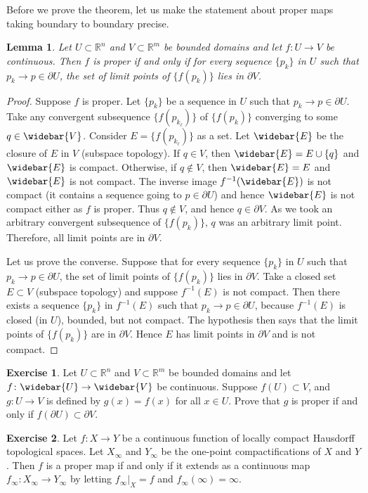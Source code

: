 \documentclass[12pt,openany]{book}
\newcommand{\R}{{\mathbb{R}}}
\theoremstyle{plain}
\newtheorem{lemma}[thm]{Lemma}
\theoremstyle{remark}
\theoremstyle{definition}
\newenvironment{exbox}{%
    \def\FrameCommand{\vrule width 1pt \relax\hspace{10pt}}%
    \MakeFramed{\advance\hsize-\width\FrameRestore}%
}{%
    \endMakeFramed
}
\theoremstyle{exercise}
\newtheorem{exercise}{Exercise}[section]
\theoremstyle{example}
\begin{document}
Before we prove the theorem, let us make the statement about
proper maps taking boundary to boundary precise.

\begin{lemma} \label{lemma:bndrytobndry}
Let $U \subset \R^n$ and $V \subset \R^m$ be bounded domains and
let $f \colon U \to V$ be continuous.
Then $f$ is proper if and only if
for every sequence $\{ p_k \}$ in $U$ such that $p_k \to p \in \partial U$,
the set of limit points of $\bigl\{ f(p_k) \bigr\}$ lies in $\partial V$.
\end{lemma}

\begin{proof}
Suppose $f$ is proper.  Let
$\{ p_k \}$ be a sequence in $U$ such that $p_k \to p \in \partial U$.
Take any convergent subsequence $\bigl\{ f(p_{k_\ell}) \bigr\}$ of
$\bigl\{ f(p_k) \bigr\}$
converging to some $q \in \widebar{V}$.  Consider
$E = \bigl\{ f(p_{k_\ell}) \bigr\}$ as a set.  Let $\widebar{E}$ be the closure of $E$
in $V$ (subspace topology).  If $q \in V$, then $\widebar{E} = E \cup \{ q
\}$ and $\widebar{E}$ is compact.
Otherwise, if $q \notin V$, then
$\widebar{E} = E$ and $\widebar{E}$ is not compact.
The inverse image $f^{-1}(\widebar{E})$
is not compact (it contains a sequence going to $p \in \partial U$)
and hence $\widebar{E}$ is not
compact either as $f$ is proper.  Thus $q \notin V$, and hence $q \in
\partial V$.
As we took an arbitrary convergent subsequence of $\bigl\{ f(p_k) \bigr\}$,
$q$ was an arbitrary limit point.
Therefore, all limit points are in $\partial V$.

Let us prove the converse.
Suppose that for every sequence
$\{ p_k \}$ in $U$ such that $p_k \to p \in \partial U$,
the set of limit points of $\bigl\{ f(p_k) \bigr\}$ lies in $\partial V$.
Take a closed set $E \subset V$ (subspace topology) and suppose $f^{-1}(E)$
is not compact.  Then there exists a sequence $\{ p_k \}$ in $f^{-1}(E)$
such that $p_k \to p \in \partial U$, because $f^{-1}(E)$ is closed
(in $U$), bounded, but not compact.
The hypothesis then says that the limit points of
$\bigl\{ f(p_k) \bigr\}$ are in $\partial V$.  Hence $E$ has limit points in
$\partial V$ and is not compact.
\end{proof}

\begin{exbox}
\begin{exercise}
Let $U \subset \R^n$ and $V \subset \R^m$ be bounded domains and
let $f \colon \widebar{U} \to \widebar{V}$ be continuous.
Suppose $f(U) \subset V$, and $g \colon U \to V$ is defined by
$g(x) = f(x)$ for all $x \in U$.
Prove that $g$ is proper if and only if $f(\partial U) \subset \partial V$.
\end{exercise}

\begin{exercise}
Let $f \colon X \to Y$ be a continuous function of locally compact Hausdorff topological spaces.
Let $X_\infty$ and $Y_\infty$ be the
one-point compactifications of $X$ and $Y$.
Then $f$ is a proper map if and only if it extends as a continuous map
$f_\infty \colon X_\infty \to Y_\infty$ by letting
$f_\infty |_X = f$ and
 $f_\infty(\infty) = \infty$.
\end{exercise}
\end{exbox}
\end{document}
